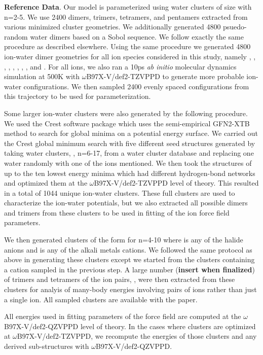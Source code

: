 \documentclass[journal=jctcce,manuscript=article]{achemso}
\begin{document}
\textbf{Reference Data}. Our model is parameterized using water clusters of size  with n=2-5. We use 2400 dimers, trimers, tetramers, and pentamers extracted from various minimized cluster geometries. We additionally generated 4800 psuedo-random water dimers based on a Sobol sequence. We follow exactly the same procedure as described elsewhere.\cite{misquitta2008first} Using the same procedure we generated 4800 ion-water dimer geometries for all ion species considered in this study, namely , , , , , , , , and . For all ions, we also ran a 10ps \textit{ab initio} molecular dynamics simulation at 500K with $\omega$B97X-V/def2-TZVPPD to generate more probable ion-water configurations. We then sampled 2400 evenly spaced configurations from this trajectory to be used for parameterization.

Some larger ion-water clusters were also generated by the following procedure. We used the Crest software package\cite{pracht2020automated} which uses the semi-empirical GFN2-XTB\cite{bannwarth2019gfn2} method to search for global minima on a potential energy surface. We carried out the Crest global minimum search with five different seed structures generated by taking water clusters, , n=6-17, from a water cluster database\cite{rakshit2019atlas} and replacing one water randomly with one of the ions mentioned. We then took the structures of up to the ten lowest energy minima which had different hydrogen-bond networks and optimized them at the $\omega$B97X-V/def2-TZVPPD level of theory. This resulted in a total of 1044 unique ion-water clusters. These full clusters are used to characterize the ion-water potentials, but we also extracted all possible dimers and trimers from these clusters to be used in fitting of the ion force field parameters.

We then generated clusters of the form  for n=4-10 where  is any of the halide anions and  is any of the alkali metals cations. We followed the same protocol as above in generating these clusters except we started from the clusters containing a cation sampled in the previous step. A large number (\textbf{insert when finalized}) of trimers and tetramers of the ion pairs, , were then extracted from these clusters for analyis of many-body energies involving pairs of ions rather than just a single ion. All sampled clusters are available with the paper.

All energies used in fitting parameters of the force field are computed at the $\omega$B97X-V/def2-QZVPPD level of theory. In the cases where clusters are optimized at $\omega$B97X-V/def2-TZVPPD, we recompute the energies of those clusters and any derived sub-structures with $\omega$B97X-V/def2-QZVPPD.
\end{document}
